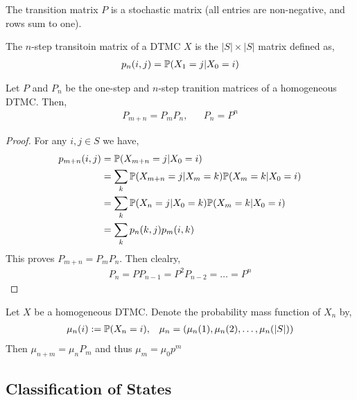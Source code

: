 \documentclass[12pt]{article}
\begin{document}
\begin{theorem}
The transition matrix \( P \) is a stochastic matrix (all entries are non-negative, and rows sum to one).
\end{theorem}

\begin{definition}
The \( n \)-step transitoin matrix of a DTMC \( X \) is the \( |S|\times |S| \) matrix defined as,
\begin{align*}
    p_n(i,j) = \mathbb{P}(X_1 = j | X_0 = i)
\end{align*}
\end{definition}

\begin{theorem}
Let \( P \) and \( P_n \) be the one-step and \( n \)-step tranition matrices of a homogeneous DTMC. Then,
\begin{align*}
    P_{m+n} = P_mP_n, && P_n = P^n
\end{align*}
\end{theorem}

\begin{proof}
For any \( i,j\in S \) we have,
\begin{align*}
    p_{m+n}(i,j) &= \mathbb{P}(X_{m+n} = j | X_0 = i) \\
    &= \sum_k \mathbb{P}(X_{m+n} = j | X_m = k) \mathbb{P}(X_m = k | X_0 = i) \\
    &= \sum_k \mathbb{P}(X_n = j | X_0 = k) \mathbb{P}(X_m = k | X_0 = i) \\
    &= \sum_k p_n(k,j) p_m(i,k)
\end{align*}
This proves \( P_{m+n} = P_mP_n \). Then clealry,
\begin{align*}
    P_n = P P_{n-1} = P^2 P_{n-2} = \ldots = P^n \tag*{\qed}
\end{align*}
\end{proof}

\begin{lemma}
Let \( X \) be a homogeneous DTMC. Denote the probability mass function of \( X_n \) by,
\begin{align*}
    \mu_n(i) := \mathbb{P}(X_n = i), && \mu_n = (\mu_n(1), \mu_n(2), \ldots, \mu_n(|S|))
\end{align*}
Then \( \mu_{n+m} = \mu_n P_m \) and thus \( \mu_m = \mu_0 p^m \)
\end{lemma}

\subsection{Classification of States}
\end{document}
